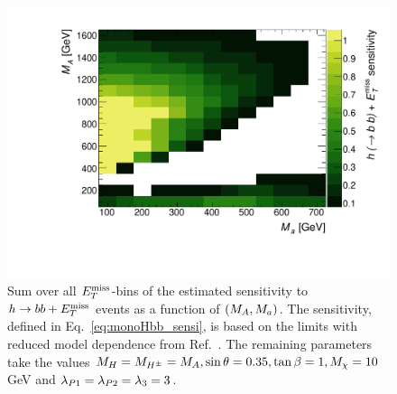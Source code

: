 \begin{figure}[tbp]
\centering
\includegraphics[width=\textwidth]{texinputs/04_grid/figures/monoHbb_sensi_sum_bins_1_2_3_4_ma_vs_mA_lin.pdf}
\caption[Sensitivity to $h\rightarrow bb + \MET$ signals in $\mA$ - $\ma$ plane, summed across $\MET$ bins]
{
Sum over all $\MET$-bins of the estimated sensitivity to $h\rightarrow bb + \MET$ events as a function of $(M_{A},M_{a})$. 
The sensitivity, defined in Eq.~\ref{eq:monoHbb_sensi}, is based on the limits with reduced model dependence from Ref.~\cite{Aaboud:2017yqz}. 
The remaining parameters take the values $ M_{H}=M_{H^{\pm}}= M_{A}, \sin\theta = 0.35, \tan\beta = 1, M_{\chi} = 10$ GeV and $ \lambda_{P1} = \lambda_{P2} = \lambda_{3} = 3 $.}
\label{fig:monoHbb_sensi_full_mA_ma}
\end{figure}

